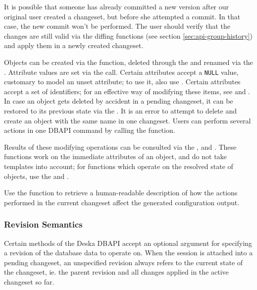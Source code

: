 \documentclass{article}
\begin{document}
It is possible that someone has already committed a new version after our original user created a changeset, but before
she attempted a commit.  In that case, the new commit won't be performed.  The user should verify that the changes are
still valid via the diffing functions (see section \ref{sec:api-group-history}) and apply them in a newly created
changeset.

Objects can be created via the  function, deleted through the  and
renamed via the .  Attribute values are set via the  call.
Certain attributes accept a {\tt NULL} value, customary to model an unset attribute; to use it, also use
.  Certain attributes accept a set of identifiers; for an effective way of modifying these
items, see  and .
In case an object gets deleted by accident in a pending changeset, it can be restored to
its previous state via the .  It is an error to attempt to delete and create an
object with the same name in one changeset.  Users can perform several actions in one DBAPI command by calling the
 function.

Results of these modifying operations can be consulted via the ,
 and .  These functions work on the
immediate attributes of an object, and do not take templates into account; for functions which operate on the resolved
state of objects, use the  and
.

Use the  function to retrieve a human-readable description of how the actions performed in
the current changeset affect the generated configuration output.

\subsubsection{Revision Semantics}
\label{sec:api-revision-semantics}

Certain methods of the Deska DBAPI accept an optional argument for specifying a revision of the database data to
operate on.  When the session is attached into a pending changeset, an unspecified revision always refers to the current
state of the changeset, ie. the parent revision and all changes applied in the active changeset so far.
\end{document}
